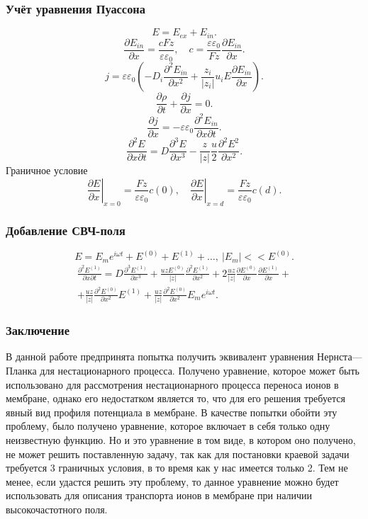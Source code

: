 \documentclass[10pt]{beamer}
\newcommand{\pder}[2] {\frac{\partial #1}{\partial #2}}
\newcommand{\ppder}[2]{\frac{\partial^2 #1}{\partial {#2}^2}}
\newcommand{\pcder}[3]{\frac{\partial^2 #1}{\partial #2 \partial #3}}
\newcommand{\abs}[1]{\left| #1 \right|}
\newcommand{\eps}{\varepsilon}
\begin{document}
  \begin{frame}
      \frametitle{Учёт уравнения Пуассона}
      \[
          E = E_{ex} + E_{in}.
      \]
      \[
        \pder{E_{in}}{x} = \frac{cFz}{\eps\eps_0},\quad
        c = \frac{\eps\eps_0}{Fz}\pder{E_{in}}{x}.
    \]
    \[
        j = \eps\eps_0
            \left(-D_i\ppder{E_{in}}{x}+\frac{z_i}{|z_i|}u_iE\pder{E_{in}}{x}\right).
        \label{eq:j_from_E}
    \]
    \[
        \pder{\rho}{t} + \pder{j}{x} = 0.
    \]
    \[
        \pder{j}{x} = -\eps\eps_0\pcder{E_{in}}{x}{t}.
        \label{eq:displacement-current}
    \]
    \[
        \pcder{E}{x}{t} = D\frac{\partial^3{E}}{\partial x^3} -
        \frac{z}{\abs{z}}\frac{u}{2}\ppder{E^2}{x}.
        \label{eq:epic-equation}
    \]
    Граничное условие
    \[
        \left.\pder{E}{x}\right|_{x=0} = \frac{Fz}{\eps\eps_0}c(0),\quad
        \left.\pder{E}{x}\right|_{x=d} = \frac{Fz}{\eps\eps_0}c(d).
    \]
    \end{frame}
  \begin{frame}
    \frametitle{Добавление СВЧ-поля}
    \[
        E = E_m e^{i\omega t} + E^{(0)} + E^{(1)} + \ldots,\ |E_m| << E^{(0)}.
    \]
    \begin{gather*}
    \pcder{E^{(1)}}{x}{t} = D\frac{\partial^3 E^{(1)}}{\partial x^3} +
    \frac{uzE^{(0)}}{\abs{z}}\ppder{E^{(1)}}{x} +
    2\frac{uz}{\abs{z}}\pder{E^{(0)}}{x}\pder{E^{(1)}}{x} +\\+
    \frac{uz}{\abs{z}}\ppder{E^{(0)}}{x} E^{(1)} +
    \frac{uz}{\abs{z}}\ppder{E^{(0)}}{x} E_m e^{i\omega t}.
\end{gather*}
  \end{frame}
  \begin{frame}
      \frametitle{Заключение}
      В данной работе предпринята попытка получить эквивалент уравнения
Нернста—Планка для нестационарного процесса. Получено уравнение, которое может быть использовано для рассмотрения нестационарного
процесса переноса ионов в мембране, однако его недостатком является то,
что для его решения требуется явный вид профиля потенциала в мембране. В
качестве попытки обойти эту проблему, было получено уравнение,
которое включает в себя только одну неизвестную функцию. Но и это
уравнение в том виде, в котором оно получено, не может решить
поставленную задачу, так как для постановки краевой задачи требуется 3
граничных условия, в то время как у нас имеется только 2. Тем не менее,
если удастся решить эту проблему, то данное уравнение можно будет
использовать для описания транспорта ионов в мембране при наличии
высокочастотного поля.
  \end{frame}
\end{document}
